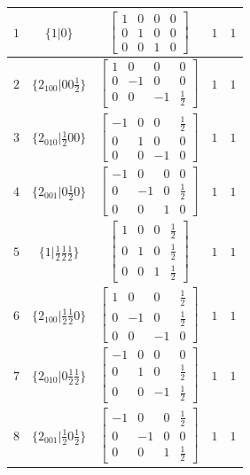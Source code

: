 \documentclass[fleqn,8pt]{jsarticle}
\begin{document}
\begin{longtable}{ccccc}
$ 1 $ & $ \{1|0\} $ & $ \begin{bmatrix} 1 & 0 & 0 & 0 \\ 0 & 1 & 0 & 0 \\ 0 & 0 & 1 & 0 \end{bmatrix} $ & $ 1 $ & $ 1 $ \\ \hline
$ 2 $ & $ \{2{}_{100}|0 0 \frac{1}{2}\} $ & $ \begin{bmatrix} 1 & 0 & 0 & 0 \\ 0 & -1 & 0 & 0 \\ 0 & 0 & -1 & \frac{1}{2} \end{bmatrix} $ & $ 1 $ & $ 1 $ \\ \hline
$ 3 $ & $ \{2{}_{010}|\frac{1}{2} 0 0\} $ & $ \begin{bmatrix} -1 & 0 & 0 & \frac{1}{2} \\ 0 & 1 & 0 & 0 \\ 0 & 0 & -1 & 0 \end{bmatrix} $ & $ 1 $ & $ 1 $ \\ \hline
$ 4 $ & $ \{2{}_{001}|0 \frac{1}{2} 0\} $ & $ \begin{bmatrix} -1 & 0 & 0 & 0 \\ 0 & -1 & 0 & \frac{1}{2} \\ 0 & 0 & 1 & 0 \end{bmatrix} $ & $ 1 $ & $ 1 $ \\ \hline
$ 5 $ & $ \{1|\frac{1}{2} \frac{1}{2} \frac{1}{2}\} $ & $ \begin{bmatrix} 1 & 0 & 0 & \frac{1}{2} \\ 0 & 1 & 0 & \frac{1}{2} \\ 0 & 0 & 1 & \frac{1}{2} \end{bmatrix} $ & $ 1 $ & $ 1 $ \\ \hline
$ 6 $ & $ \{2{}_{100}|\frac{1}{2} \frac{1}{2} 0\} $ & $ \begin{bmatrix} 1 & 0 & 0 & \frac{1}{2} \\ 0 & -1 & 0 & \frac{1}{2} \\ 0 & 0 & -1 & 0 \end{bmatrix} $ & $ 1 $ & $ 1 $ \\ \hline
$ 7 $ & $ \{2{}_{010}|0 \frac{1}{2} \frac{1}{2}\} $ & $ \begin{bmatrix} -1 & 0 & 0 & 0 \\ 0 & 1 & 0 & \frac{1}{2} \\ 0 & 0 & -1 & \frac{1}{2} \end{bmatrix} $ & $ 1 $ & $ 1 $ \\ \hline
$ 8 $ & $ \{2{}_{001}|\frac{1}{2} 0 \frac{1}{2}\} $ & $ \begin{bmatrix} -1 & 0 & 0 & \frac{1}{2} \\ 0 & -1 & 0 & 0 \\ 0 & 0 & 1 & \frac{1}{2} \end{bmatrix} $ & $ 1 $ & $ 1 $ \\ \hline

\end{longtable}
\end{document}
